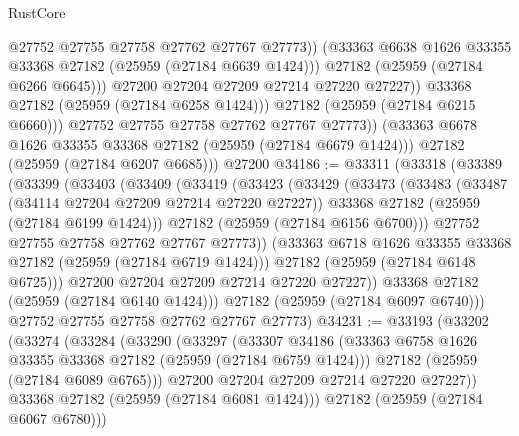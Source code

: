 \begin{lexlean}{RustCore}
\begin{coremodule}
                        @27752
                        @27755
                        @27758
                        @27762
                        @27767
                        @27773))
                    (@33363 @6638 @1626 @33355 @33368 @27182 (@25959 (@27184 @6639 @1424)))
                    @27182
                    (@25959 (@27184 @6266 @6645)))
                  @27200
                  @27204
                  @27209
                  @27214
                  @27220
                  @27227))
              @33368
              @27182
              (@25959 (@27184 @6258 @1424)))
            @27182
            (@25959 (@27184 @6215 @6660)))
          @27752
          @27755
          @27758
          @27762
          @27767
          @27773))
      (@33363 @6678 @1626 @33355 @33368 @27182 (@25959 (@27184 @6679 @1424)))
      @27182
      (@25959 (@27184 @6207 @6685)))
    @27200
@34186 := @33311
    (@33318
      (@33389
        (@33399
          (@33403
            (@33409
              (@33419
                (@33423
                  (@33429
                    (@33473
                      (@33483
                        (@33487 (@34114 @27204 @27209 @27214 @27220 @27227))
                        @33368
                        @27182
                        (@25959 (@27184 @6199 @1424)))
                      @27182
                      (@25959 (@27184 @6156 @6700)))
                    @27752
                    @27755
                    @27758
                    @27762
                    @27767
                    @27773))
                (@33363 @6718 @1626 @33355 @33368 @27182 (@25959 (@27184 @6719 @1424)))
                @27182
                (@25959 (@27184 @6148 @6725)))
              @27200
              @27204
              @27209
              @27214
              @27220
              @27227))
          @33368
          @27182
          (@25959 (@27184 @6140 @1424)))
        @27182
        (@25959 (@27184 @6097 @6740)))
      @27752
      @27755
      @27758
      @27762
      @27767
      @27773)
@34231 := @33193
    (@33202
      (@33274
        (@33284
          (@33290
            (@33297
              (@33307
                @34186
                (@33363 @6758 @1626 @33355 @33368 @27182 (@25959 (@27184 @6759 @1424)))
                @27182
                (@25959 (@27184 @6089 @6765)))
              @27200
              @27204
              @27209
              @27214
              @27220
              @27227))
          @33368
          @27182
          (@25959 (@27184 @6081 @1424)))
        @27182
        (@25959 (@27184 @6067 @6780)))

\end{coremodule}
\end{lexlean}
